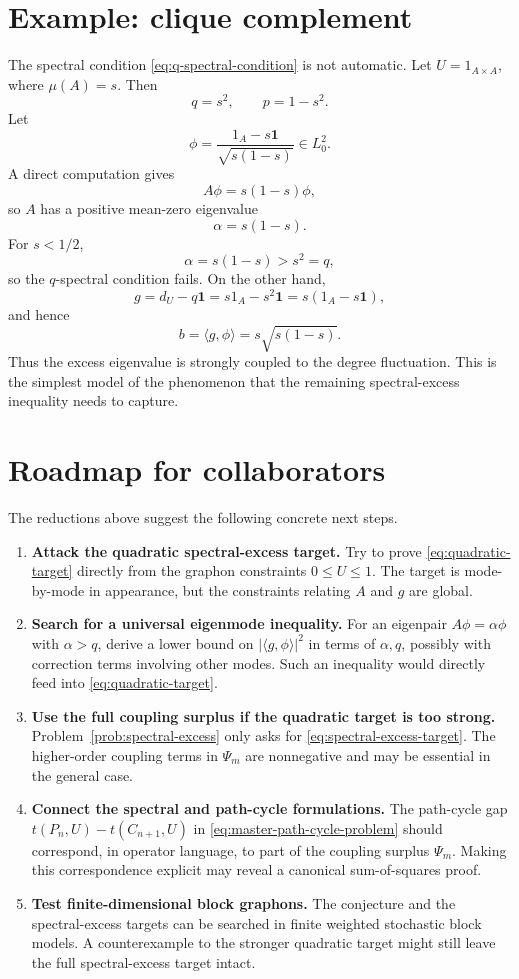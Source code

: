 \documentclass[11pt]{article}
\theoremstyle{definition}
\theoremstyle{remark}
\newcommand{\one}{\mathbf 1}
\newcommand{\ip}[2]{\langle #1,#2\rangle}
\begin{document}
\section{Example: clique complement}

The spectral condition \eqref{eq:q-spectral-condition} is not automatic.  Let $U=1_{A\times A}$, where $\mu(A)=s$.  Then
\[
  q=s^2,
  \qquad
  p=1-s^2.
\]
Let
\[
  \phi=\frac{1_A-s\one}{\sqrt{s(1-s)}}\in L^2_0.
\]
A direct computation gives
\[
  A\phi=s(1-s)\phi,
\]
so $A$ has a positive mean-zero eigenvalue
\[
  \alpha=s(1-s).
\]
For $s<1/2$,
\[
  \alpha=s(1-s)>s^2=q,
\]
so the $q$-spectral condition fails.  On the other hand,
\[
  g=d_U-q\one=s1_A-s^2\one=s(1_A-s\one),
\]
and hence
\[
  b=\ip{g}{\phi}=s\sqrt{s(1-s)}.
\]
Thus the excess eigenvalue is strongly coupled to the degree fluctuation.  This is the simplest model of the phenomenon that the remaining spectral-excess inequality needs to capture.

\section{Roadmap for collaborators}

The reductions above suggest the following concrete next steps.

\begin{enumerate}[leftmargin=2em]
  \item \textbf{Attack the quadratic spectral-excess target.}  Try to prove \eqref{eq:quadratic-target} directly from the graphon constraints $0\le U\le1$.  The target is mode-by-mode in appearance, but the constraints relating $A$ and $g$ are global.

  \item \textbf{Search for a universal eigenmode inequality.}  For an eigenpair $A\phi=\alpha\phi$ with $\alpha>q$, derive a lower bound on $|\ip{g}{\phi}|^2$ in terms of $\alpha,q$, possibly with correction terms involving other modes.  Such an inequality would directly feed into \eqref{eq:quadratic-target}.

  \item \textbf{Use the full coupling surplus if the quadratic target is too strong.}  Problem~\ref{prob:spectral-excess} only asks for \eqref{eq:spectral-excess-target}.  The higher-order coupling terms in $\Psi_m$ are nonnegative and may be essential in the general case.

  \item \textbf{Connect the spectral and path-cycle formulations.}  The path-cycle gap $t(P_n,U)-t(C_{n+1},U)$ in \eqref{eq:master-path-cycle-problem} should correspond, in operator language, to part of the coupling surplus $\Psi_m$.  Making this correspondence explicit may reveal a canonical sum-of-squares proof.

  \item \textbf{Test finite-dimensional block graphons.}  The conjecture and the spectral-excess targets can be searched in finite weighted stochastic block models.  A counterexample to the stronger quadratic target might still leave the full spectral-excess target intact.
\end{enumerate}
\end{document}
